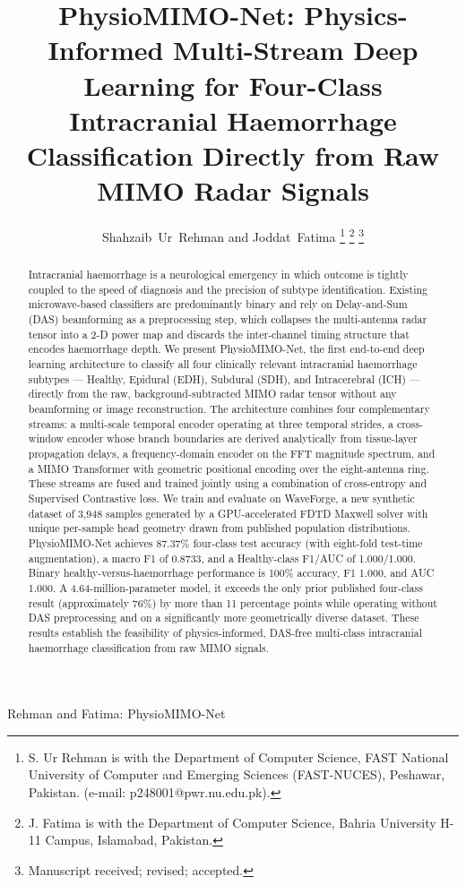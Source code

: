 \documentclass[journal]{IEEEtran}
\begin{document}
\title{PhysioMIMO-Net: Physics-Informed Multi-Stream Deep
       Learning for Four-Class Intracranial Haemorrhage
       Classification Directly from Raw MIMO Radar Signals}

\author{%
  Shahzaib~Ur~Rehman and Joddat~Fatima%
  \thanks{S. Ur Rehman is with the Department of Computer
    Science, FAST National University of Computer and Emerging
    Sciences (FAST-NUCES), Peshawar, Pakistan.
    (e-mail: p248001@pwr.nu.edu.pk).}%
  \thanks{J. Fatima is with the Department of Computer
    Science, Bahria University H-11 Campus, Islamabad,
    Pakistan.}%
  \thanks{Manuscript received; revised; accepted.}%
}

%
         {Rehman and Fatima: PhysioMIMO-Net}

\maketitle

\begin{abstract}
Intracranial haemorrhage is a neurological emergency in which
outcome is tightly coupled to the speed of diagnosis and the
precision of subtype identification.  Existing microwave-based
classifiers are predominantly binary and rely on Delay-and-Sum
(DAS) beamforming as a preprocessing step, which collapses
the multi-antenna radar tensor into a 2-D power map and
discards the inter-channel timing structure that encodes
haemorrhage depth.  We present PhysioMIMO-Net, the first
end-to-end deep learning architecture to classify all four
clinically relevant intracranial haemorrhage subtypes ---
Healthy, Epidural (EDH), Subdural (SDH), and Intracerebral
(ICH) --- directly from the raw, background-subtracted MIMO
radar tensor without any beamforming or image reconstruction.
The architecture combines four complementary
streams: a multi-scale temporal encoder operating at three
temporal strides, a cross-window encoder whose branch
boundaries are derived analytically from tissue-layer
propagation delays, a frequency-domain encoder on the FFT
magnitude spectrum, and a MIMO Transformer with geometric
positional encoding over the eight-antenna ring.  These
streams are fused and trained jointly using a combination of
cross-entropy and Supervised Contrastive loss.  We train and
evaluate on WaveForge, a new synthetic dataset of 3{,}948
samples generated by a GPU-accelerated FDTD Maxwell solver
with unique per-sample head geometry drawn from published
population distributions.  PhysioMIMO-Net achieves
87.37\% four-class test accuracy (with eight-fold test-time
augmentation), a macro F1 of 0.8733, and a Healthy-class
F1/AUC of 1.000/1.000.  Binary healthy-versus-haemorrhage
performance is 100\% accuracy, F1 1.000, and AUC 1.000.  A
4.64-million-parameter model, it exceeds the only prior
published four-class result (approximately 76\%) by more than
11 percentage points while operating without DAS preprocessing
and on a significantly more geometrically diverse dataset.
These results establish the feasibility of physics-informed,
DAS-free multi-class intracranial haemorrhage classification
from raw MIMO signals.
\end{abstract}
\end{document}
